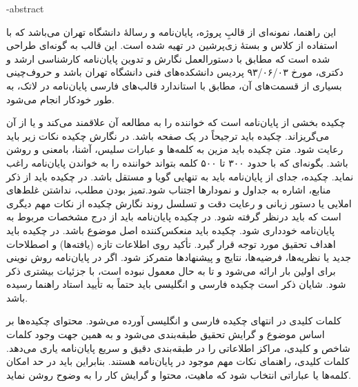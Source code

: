 \fa-abstract{
این راهنما، نمونه‌ای از قالبِ پروژه، پایان‌نامه و رسالهٔ دانشگاه تهران می‌باشد که با استفاده از کلاس 
و بستهٔ زی‌پرشین در \lr{\LaTeX}{} تهیه شده است. این قالب به گونه‌ای طراحی شده است که مطابق با دستورالعمل نگارش و تدوین پایان‌نامه کارشناسی ارشد و دکتری، مورخ ۹۳/۰۶/۰۳ پردیس دانشکده‌های فنی دانشگاه تهران باشد و حروف‌چینی بسیاری از قسمت‌های آن، مطابق با استاندارد قالب‌های فارسی پایان‌نامه در لاتک، به طور خودکار انجام می‌شود.

چكیده بخشی از پایان‌نامه است كه خواننده را به مطالعه آن علاقمند می‌كند و یا از آن می‌گریزاند. چكیده باید ترجیحاً‌ در یک صفحه باشد. در نگارش چکیده نکات زیر باید رعایت شود. متن چكيده باید مزین به کلمه‌ها و عبارات سليس، آشنا، بامعنی و روشن باشد. بگونه‌ای که با حدود ۳۰۰ تا ۵۰۰ کلمه بتواند خواننده را به خواندن پایان‌نامه راغب نماید. چكيده، جدای از پا‌یان‌نامه بايد به تنهایی گويا و مستقل باشد. در چکیده باید از ذکر منابع، اشاره به جداول و نمودارها اجتناب شود.تمیز بودن مطلب، نداشتن غلط‌های املایی یا دستور زبانی و رعایت دقت و تسلسل روند نگارش چکيده از نکات مهم دیگری است كه باید درنظر گرفته شود. در چکیده پایان‌نامه باید از درج مشخصات مربوط به پایان‌نامه خودداری شود.
چکیده باید منعکس‌کننده اصل موضوع باشد. در چکیده باید اهداف تحقیق مورد توجه قرار گیرد. تأکید روی اطلاعات تازه (یافته‌ها) و اصطلاحات جدید یا نظریه‌ها، فرضیه‌ها، نتایج و پیشنهادها متمركز شود. اگر در پایان‌نامه روش نوینی برای اولین بار ارائه می‌شود و تا به حال معمول نبوده است، با جزئیات بیشتری ذكر شود. شایان ذکر است چکیده فارسی و انگلیسی باید حتماً به تأیید استاد راهنما رسیده باشد.

کلمات کلیدی در انتهای چکیده فارسی و انگلیسی آورده می‌شود. محتوای چکیده‌ها بر اساس موضوع و گرایش تحقیق طبقه‌بندی می‌شود و به همین جهت وجود کلمات شاخص و كلیدی، مراکز اطلاعاتی  را در طبقه‌بندی دقیق و سریع پایان‌نامه یاری می‌دهد. کلمات کلیدی، راهنمای نکات مهم موجود در پایان‌نامه هستند. بنابراین باید در حد امکان کلمه‌ها یا عباراتی انتخاب شود که ماهیت، محتوا و گرايش کار را به وضوح روشن نماید.
}
\titlePage
\ifoptiondraft{}{%
	\besmPage
	\titlePage
	\davaranPage


	\esalatPage
	\mojavezPage
	\taghdimPage
	\ghadrdaniPage
} %
\abstractPage
\newpage\clearpage
{} %
\tableofcontents \newpage

\pagestyle{fancy}
